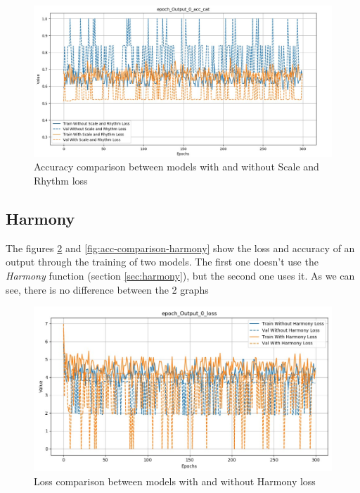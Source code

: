 \documentclass[12pt]{report}
\begin{document}
\begin{figure}[ht]
    \centering
    \includegraphics[width=\textwidth]{images/experiences/scale_rhythm/acc-comparison-scale-rhythm.jpg}
    \caption{Accuracy comparison between models with and without Scale and Rhythm loss}
    \label{fig:acc-comparison-scale-rhythm}
\end{figure}

\subsection{Harmony}

The figures \ref{fig:loss-comparison-harmony} and \ref{fig:acc-comparison-harmony} show the loss and accuracy of an output through the training of two models.
The first one doesn't use the \textit{Harmony} function (section \ref{sec:harmony}), but the second one uses it.
As we can see, there is no difference between the 2 graphs

\begin{figure}[ht]
    \centering
    \includegraphics[width=\textwidth]{images/experiences/harmony/loss-comparison-harmony.jpg}
    \caption{Loss comparison between models with and without Harmony loss}
    \label{fig:loss-comparison-harmony}
\end{figure}
\end{document}
